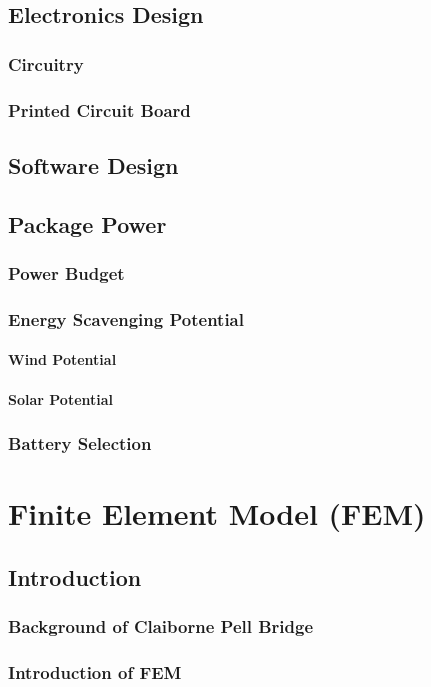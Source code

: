\documentclass[twoside,11pt]{report}
\begin{document}
	\section{Electronics Design}
			\subsection{Circuitry}
			\subsection{Printed Circuit Board}
	\section{Software Design}
	\section{Package Power}
		\subsection{Power Budget}
		\subsection{Energy Scavenging Potential}
			\subsubsection{Wind Potential}
			\subsubsection{Solar Potential}
		\subsection{Battery Selection}
\chapter{Finite Element Model (FEM)}
	\section{Introduction}
		\subsection{Background of Claiborne Pell Bridge}
		\subsection{Introduction of FEM}
\end{document}
